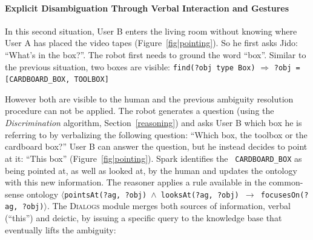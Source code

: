 \documentclass[preprint,3p,times]{elsarticle}
\newcommand{\concept}[1]{{\small \texttt{#1}}}
\newcommand{\stmt}[1]{{\footnotesize\tt$\langle$#1\relax$\rangle$}}
\begin{document}
%
\paragraph{Explicit Disambiguation Through Verbal Interaction and Gestures}

In this second situation, User B enters the living room without knowing where
User A has placed the video tapes (Figure~\ref{fig|pointing}). So he first asks
Jido: ``What's in the box?''. The robot first needs to ground the word ``box''.
Similar to the previous situation, two boxes are visible: \concept{find(?obj
type Box)} $\Rightarrow$ \concept{?obj = [CARDBOARD\_BOX, TOOLBOX]}

However both are visible to the human and the previous ambiguity resolution
procedure can not be applied. The robot generates a question (using the
\emph{Discrimination} algorithm, Section~\ref{reasoning})
and asks User B which box he is referring to by verbalizing the following question: ``Which box, the toolbox or the
cardboard box?'' User B can answer the question, but he instead decides to point
at it: ``This box'' (Figure~\ref{fig|pointing}). {\sc Spark} identifies the {\tt
CARDBOARD\_BOX} as being pointed at, as well as looked at, by the human and updates the
ontology with this new information. The reasoner applies a rule available in the common-sense
ontology \stmt{pointsAt(?ag, ?obj) $\land$ looksAt(?ag, ?obj) $\to$
focusesOn(?ag, ?obj)}. The \textsc{Dialogs} module merges both
sources of information, verbal (``this'') and deictic, by issuing a specific
query to the knowledge base that eventually lifts the ambiguity:
\end{document}
